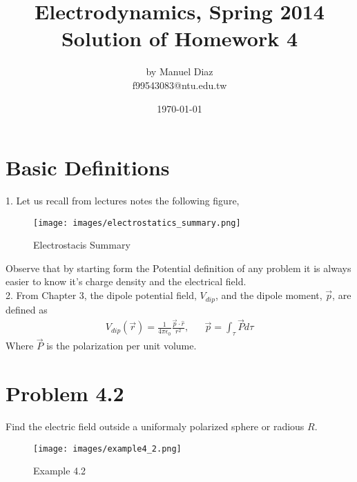 

%

\title{Electrodynamics, Spring 2014 \\ Solution of Homework 4}
\author{by Manuel Diaz\\
			f99543083@ntu.edu.tw\\}
\date{\today}


\maketitle

\section{Basic Definitions}
1. Let us recall from lectures notes the following figure,
\begin{figure}[h]
	\centering
	\texttt{[image: images/electrostatics\_summary.png]} 
	\caption{Electrostacis Summary}
	\label{fig:electrostatics_summary}
\end{figure}

Observe that by starting form the Potential definition of any problem it is always easier to know it's charge density and the electrical field.\\
2. From Chapter 3, the dipole potential field, $V_{dip}$, and the dipole moment, $\vec{p}$, are defined as
\begin{align}
	& V_{dip}(\vec{r}) = \frac{1}{4\pi \epsilon_0}\frac{\vec{p}\cdot\hat{r}}{r^2},& &\vec{p} = \int_{\tau}\vec{P}d\tau&
\end{align}
Where $\vec{P}$ is the polarization per unit volume.

\section{Problem 4.2}
Find the electric field outside a uniformaly polarized sphere or radious $R$.\\
\begin{figure}
	\centering
	\texttt{[image: images/example4\_2.png]} 
	\caption{Example 4.2}
	\label{fig:example_4.2}
\end{figure}

